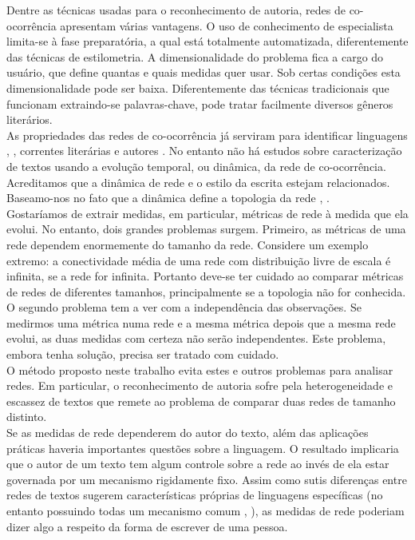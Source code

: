 \documentclass[a4paper,openright,12pt]{report} %
\begin{document}
Dentre as t\'ecnicas usadas para o reconhecimento de autoria, redes de co-ocorr\^encia apresentam v\'arias vantagens. O uso de conhecimento de especialista limita-se \`a fase preparat\'oria, a qual est\'a totalmente automatizada, diferentemente das t\'ecnicas de estilometria. 
A dimensionalidade do problema fica a cargo do usu\'ario, que define quantas e quais medidas quer usar. Sob certas condi\c c\~oes esta dimensionalidade pode ser baixa. 
Diferentemente das t\'ecnicas tradicionais que funcionam extraindo-se palavras-chave, pode tratar facilmente diversos g\^eneros liter\'arios.\\

As propriedades das redes de co-ocorr\^encia j\'a serviram para identificar linguagens \cite{ferrer2001two}, \cite{biemann2009networks}, correntes liter\'arias \cite{amancio2012identification} e autores \cite{amancio2011comparing}. No entanto n\~ao h\'a estudos sobre caracteriza\c c\~ao de textos usando a evolu\c c\~ao temporal, ou din\^amica, da rede de co-ocorr\^encia. Acreditamos que a din\^amica de rede e o estilo da escrita estejam relacionados. Baseamo-nos no fato que a din\^amica define a topologia da rede \cite{barabasi1999emergence}, \cite{dorogovtsev2001language}.\\

Gostar\'iamos de extrair medidas, em particular, m\'etricas de rede \`a medida que ela evolui. No entanto, dois grandes problemas surgem. Primeiro, as m\'etricas de uma rede dependem enormemente do tamanho da rede. Considere um exemplo extremo: a conectividade m\'edia de uma rede com distribui\c c\~ao livre de escala \'e infinita, se a rede for infinita. Portanto deve-se ter cuidado ao comparar m\'etricas de redes de diferentes tamanhos, principalmente se a topologia n\~ao for conhecida. O segundo problema tem a ver com a independ\^encia das observa\c c\~oes. Se medirmos uma m\'etrica numa rede e a mesma m\'etrica depois que a mesma rede evolui, as duas medidas com certeza n\~ao ser\~ao independentes. Este problema, embora tenha solu\c c\~ao, precisa ser tratado com cuidado.\\

O m\'etodo proposto neste trabalho evita estes e outros problemas para analisar redes. Em particular, o reconhecimento de autoria sofre pela heterogeneidade e escassez de textos que remete ao problema de comparar duas redes de tamanho distinto.\\

Se as medidas de rede dependerem do autor do texto, al\'em das aplica\c c\~oes pr\'aticas haveria importantes quest\~oes sobre a linguagem. O resultado implicaria que o autor de um texto tem algum controle sobre a rede ao inv\'es de ela estar governada por um mecanismo rigidamente fixo. Assim como sutis diferen\c cas entre redes de textos sugerem caracter\'isticas pr\'oprias de linguagens espec\'ificas (no entanto possuindo todas um mecanismo comum \cite{ferrer2001two}, \cite{dorogovtsev2001language}), as medidas de rede poderiam dizer algo a respeito da forma de escrever de uma pessoa.\\
\end{document}
